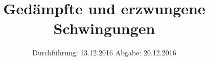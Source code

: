 

\subject{V354}
\title{Gedämpfte und erzwungene Schwingungen}
\date{
\centering
  Durchführung: 13.12.2016
  \hspace{3em}
  Abgabe: 20.12.2016
}



\maketitle
\thispagestyle{empty}
\tableofcontents
\newpage



%




\printbibliography


